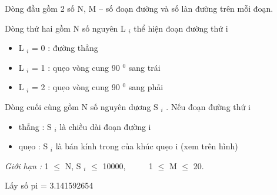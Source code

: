 Dòng đầu gồm 2 số N, M – số đoạn đường và số làn đường trên mỗi đoạn.

Dòng thứ hai gồm N số nguyên L $_ i $ thể hiện đoạn đường thứ i
\begin{itemize}
	\item L $_ i $ = 0 : đường thẳng
	\item L $_ i $ = 1 : quẹo vòng cung 90 $^ 0 $ sang trái
	\item L $_ i $ = 2 : quẹo vòng cung 90 $^ 0 $ sang phải
\end{itemize}

Dòng cuối cùng gồm N số nguyên dương S $_ i $ . Nếu đoạn đường thứ i
\begin{itemize}
	\item thẳng : S $_ i $ là chiều dài đoạn đường i
	\item quẹo : S $_ i $ là bán kính trong của khúc quẹo i (xem trên hình)
\end{itemize}

\emph{Giới hạn : } 1  $\le$  N, S $_ i $  $\le$  10000,       1  $\le$  M  $\le$  20.

Lấy số pi = 3.141592654

\
